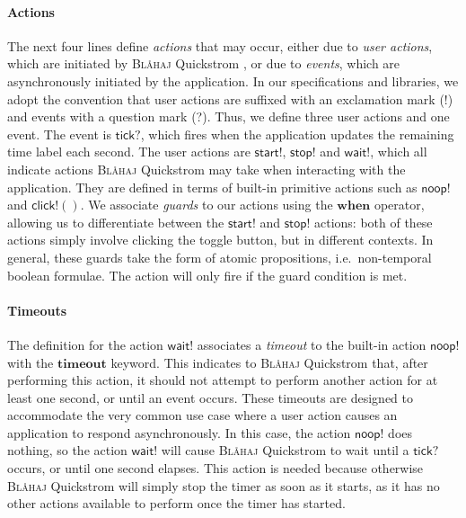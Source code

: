 \documentclass[sigplan,nonacm,10pt]{acmart}
\makeatletter
\newcommand{\Quickstrom}[0]{%
  \if@ACM@anonymous%
  \textsc{Bl\aa{}haj}%
  \else%
  Quickstrom%
  \fi\xspace}
\makeatother
\begin{document}
 \paragraph{Actions} The next four lines define \emph{actions} that may occur, either due to \emph{user actions}, which are initiated by \Quickstrom, or due to \emph{events}, which are asynchronously initiated
 by the application. In our specifications and libraries, we adopt the convention that user actions are suffixed with an exclamation mark (!) and events with a question mark (?).
 Thus, we define three user actions and one event. The event is $\mathsf{tick?}$, which fires when the application updates the remaining time label each second.
 The user actions are $\mathsf{start!}$, $\mathsf{stop!}$ and $\mathsf{wait!}$, which all indicate actions \Quickstrom may take when
 interacting with the application. They are defined in terms of built-in primitive actions such as $\mathsf{noop!}$ and $\mathsf{click!}()$. We associate \emph{guards} to our actions using
 the $\textbf{when}$ operator, allowing us to differentiate between the $\mathsf{start!}$ and $\mathsf{stop!}$ actions: both of these actions simply involve clicking the toggle button, but in different contexts.
 In general, these guards take the form of atomic propositions, i.e.\ non-temporal boolean formulae. The action will only fire if the guard condition is met.

 \paragraph{Timeouts} The definition for the action $\mathsf{wait!}$ associates a \emph{timeout} to the built-in action $\mathsf{noop!}$ with the $\mathbf{timeout}$ keyword.
 This indicates to \Quickstrom that, after performing this action, it should not attempt to perform another action for at least one second, or until an event occurs. These timeouts
 are designed to accommodate the very common use case where a user action causes an application to respond asynchronously. In this case, the action $\mathsf{noop!}$ does nothing, so
 the action $\mathsf{wait!}$ will cause \Quickstrom to wait until a $\mathsf{tick?}$ occurs, or until one second elapses. This action is needed because otherwise \Quickstrom will simply stop the timer as soon as it starts, as
 it has no other actions available to perform once the timer has started.
\end{document}
